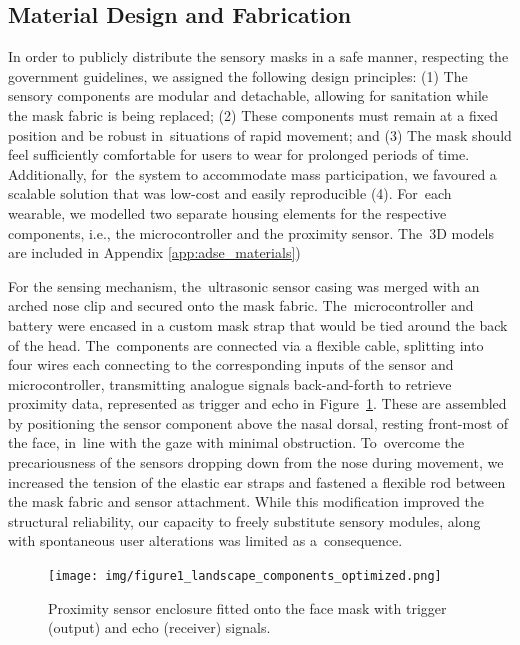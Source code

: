 {\subsection*{Material Design and Fabrication}
\label{subsec:fabrication}

In order to publicly distribute the sensory masks in a safe manner, respecting the government guidelines, we assigned the following design principles: (1) The sensory components are modular and detachable, allowing for sanitation while the mask fabric is being replaced; (2) These components must remain at a fixed position and be robust in~situations of rapid movement; and (3) The mask should feel sufficiently comfortable for users to wear for prolonged periods of time. Additionally, for~the system to accommodate mass participation, we favoured a scalable solution that was low-cost and easily reproducible (4). For~each wearable, we modelled two separate housing elements for the respective components, i.e., the microcontroller and the proximity sensor. The~3D models are included in Appendix \ref{app:adse_materials})

For the sensing mechanism, the~ultrasonic sensor casing was merged with an arched nose clip and secured onto the mask fabric. The~microcontroller and battery were encased in a custom mask strap that would be tied around the back of the head. The~components are connected via a flexible cable, splitting into four wires each connecting to the corresponding inputs of the sensor and microcontroller, transmitting analogue signals back-and-forth to retrieve proximity data, represented as trigger and echo in Figure~\ref{fig:sensor_model}. These are assembled by positioning the sensor component above the nasal dorsal, resting front-most of the face, in~line with the gaze with minimal obstruction. To~overcome the precariousness of the sensors dropping down from the nose during movement, we increased the tension of the elastic ear straps and fastened a flexible rod between the mask fabric and sensor attachment. While this modification improved the structural reliability, our capacity to freely substitute sensory modules, along with spontaneous user alterations was limited as a~consequence.

\begin{figure}[H]
\captionsetup{width=1.0\textwidth}
\texttt{[image: img/figure1\_landscape\_components\_optimized.png]}
{\caption{Proximity sensor enclosure fitted onto the face mask with trigger (output) and echo (receiver) signals.
}\label{fig:sensor_model}}
\end{figure}
\unskip

}
